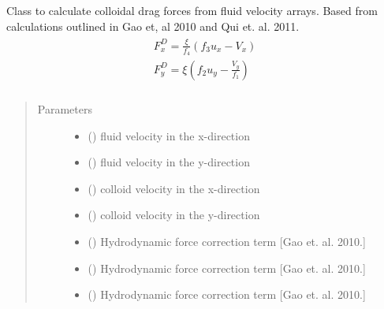 \documentclass[letterpaper,10pt,english]{sphinxmanual}
\begin{document}
\begin{fulllineitems}
\label{\detokenize{index:lb_colloids.Colloids.Colloid_Math.Drag}}
Class to calculate colloidal drag forces from fluid velocity arrays. Based from calculations
outlined in Gao et, al 2010 and Qui et. al. 2011.
\begin{align*}\!\begin{aligned}
F_{x}^{D} = \frac{\xi}{f_{4}} (f_{3}u_{x} - V_{x})\\
F_{y}^{D} = \xi (f_{2} u_{y} - \frac{V_{y}}{f_{1}})\\
\end{aligned}\end{align*}\begin{quote}\begin{description}
\item[{Parameters}] \leavevmode\begin{itemize}
\item {} 
 () \textendash{} fluid velocity in the x-direction

\item {} 
 () \textendash{} fluid velocity in the y-direction

\item {} 
 () \textendash{} colloid velocity in the x-direction

\item {} 
 () \textendash{} colloid velocity in the y-direction

\item {} 
 () \textendash{} Hydrodynamic force correction term {[}Gao et. al. 2010.{]}

\item {} 
 () \textendash{} Hydrodynamic force correction term {[}Gao et. al. 2010.{]}

\item {} 
 () \textendash{} Hydrodynamic force correction term {[}Gao et. al. 2010.{]}


\end{itemize}
\end{description}
\end{quote}
\end{fulllineitems}
\end{document}
